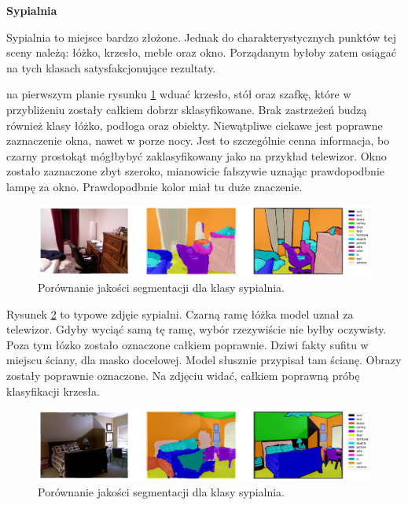 \noindent
\textbf{Sypialnia}

Sypialnia to miejsce bardzo złożone. Jednak do charakterystycznych punktów tej sceny należą: łóżko, krzesło, meble oraz okno. Porządanym byłoby zatem osiągać na tych klasach satysfakcjonujące rezultaty.

na pierwszym planie rysunku \ref{fig:bedroom-pred-1} wduać krzesło, stół oraz szafkę, które w przybliżeniu zostały całkiem dobrzr sklasyfikowane. Brak zastrzeżeń budzą również klasy łóżko, podłoga oraz obiekty. Niewątpliwe ciekawe jest poprawne zaznaczenie okna, nawet w porze nocy. Jest to szczególnie cenna informacja, bo czarny prostokąt mógłbybyć zaklasyfikowany jako na przykład telewizor. Okno zostało zaznaczone zbyt szeroko, mianowicie fałszywie uznając prawdopodbnie lampę za okno. Prawdopodbnie kolor miał tu duże znaczenie.

\begin{figure}[ht!]
    \centering
    \includegraphics[width=\textwidth]{img/preds_analysis/gt_vs_pred/bedroom-1.png}
    \caption{Porównanie jakości segmentacji dla klasy sypialnia.}
    \label{fig:bedroom-pred-1}
\end{figure}

Rysunek \ref{fig:bedroom-pred-2} to typowe zdjęie sypialni. Czarną ramę łóżka model uznał za telewizor. Gdyby wyciąć samą tę ramę, wybór rzezywiście nie byłby oczywisty. Poza tym łózko zostało oznaczone całkiem poprawnie. Dziwi fakty sufitu w miejscu ściany, dla masko docelowej. Model słusznie przypisał tam ścianę. Obrazy zostały poprawnie oznaczone. Na zdjęciu widać, całkiem poprawną próbę klasyfikacji krzesła.

\begin{figure}[ht!]
    \centering
    \includegraphics[width=\textwidth]{img/preds_analysis/gt_vs_pred/bedroom-2.png}
    \caption{Porównanie jakości segmentacji dla klasy sypialnia.}
    \label{fig:bedroom-pred-2}
\end{figure}

